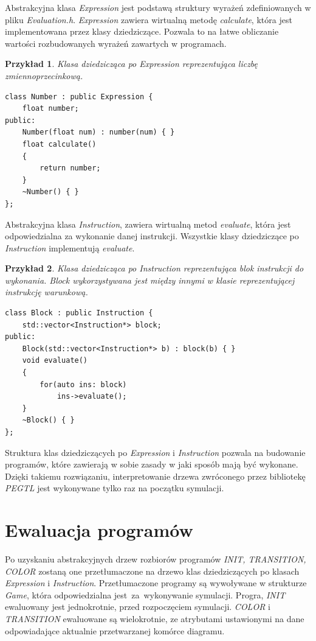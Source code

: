 \documentclass[declaration,shortabstract, inz]{iithesis}
\theoremstyle{definition} \newtheorem{definition}{Definicja}[]
\theoremstyle{plain} \newtheorem{remark}[definition]{Obserwacja}
\theoremstyle{plain} \newtheorem{theorem}[definition]{Twierdzenie}
\theoremstyle{plain} \newtheorem{example}{Przykład}[definition]
\theoremstyle{plain} \newtheorem{lemma}[definition]{Lemat}
\begin{document}
Abstrakcyjna klasa \textit{Expression} jest podstawą struktury wyrażeń zdefiniowanych w pliku \textit{Evaluation.h}. \textit{Expression} zawiera wirtualną metodę \textit{calculate}, która jest implementowana przez klasy dziedziczące. Pozwala to na łatwe obliczanie wartości rozbudowanych wyrażeń zawartych w programach.

\begin{example}
Klasa dziedzicząca po \textit{Expression} reprezentująca liczbę zmiennoprzecinkową.
\begin{center}
\begin{lstlisting}
class Number : public Expression {
    float number;
public:
    Number(float num) : number(num) { }
    float calculate()
    {
        return number;
    }
    ~Number() { }
};
\end{lstlisting}
\end{center}
\end{example}

Abstrakcyjna klasa \textit{Instruction}, zawiera wirtualną metod \textit{evaluate}, która jest odpowiedzialna za wykonanie danej instrukcji. Wszystkie klasy dziedziczące po \textit{Instruction} implementują \textit{evaluate}. 

\begin{example}
Klasa dziedzicząca po \textit{Instruction} reprezentująca blok instrukcji do wykonania. \textit{Block} wykorzystywana jest między innymi w klasie reprezentującej instrukcję warunkową.
\begin{center}
\begin{lstlisting}
class Block : public Instruction {
    std::vector<Instruction*> block;
public:
    Block(std::vector<Instruction*> b) : block(b) { }
    void evaluate()
    {
        for(auto ins: block)
            ins->evaluate();
    }
    ~Block() { }
};
\end{lstlisting}
\end{center}
\end{example}

Struktura klas dziedziczących po \textit{Expression} i \textit{Instruction} pozwala na budowanie programów, które zawierają w sobie zasady w jaki sposób mają być wykonane. Dzięki takiemu rozwiązaniu, interpretowanie drzewa zwróconego przez bibliotekę \textit{PEGTL} jest wykonywane tylko raz na początku symulacji. 

\section{Ewaluacja programów}
Po uzyskaniu abstrakcyjnych drzew rozbiorów programów \textit{INIT, TRANSITION, COLOR} zostaną one przetłumaczone na drzewo klas dziedziczących po klasach \textit{Expression} i \textit{Instruction}. Przetłumaczone programy są wywoływane w strukturze \textit{Game}, która odpowiedzialna jest~za~wykonywanie symulacji. Progra, \textit{INIT} ewaluowany jest jednokrotnie, przed rozpoczęciem symulacji. \textit{COLOR} i \textit{TRANSITION} ewaluowane są wielokrotnie, ze atrybutami ustawionymi na dane odpowiadające aktualnie przetwarzanej komórce diagramu. 
\end{document}
